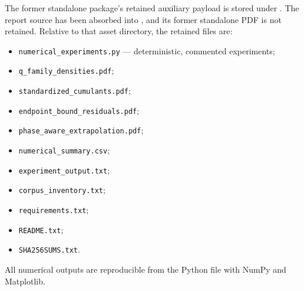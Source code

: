 \documentclass[11pt]{article}
\numberwithin{equation}{section}
\theoremstyle{definition}
\theoremstyle{remark}
\begin{document}
The former standalone package's retained auxiliary payload is stored under
.  The report source has been absorbed into
, and its former standalone PDF is not retained.  Relative to
that asset directory, the retained files are:
\begin{itemize}
\item \texttt{numerical\_experiments.py} --- deterministic, commented experiments;
\item \texttt{q\_family\_densities.pdf};
\item \texttt{standardized\_cumulants.pdf};
\item \texttt{endpoint\_bound\_residuals.pdf};
\item \texttt{phase\_aware\_extrapolation.pdf};
\item \texttt{numerical\_summary.csv};
\item \texttt{experiment\_output.txt};
\item \texttt{corpus\_inventory.txt};
\item \texttt{requirements.txt};
\item \texttt{README.txt};
\item \texttt{SHA256SUMS.txt}.
\end{itemize}
All numerical outputs are reproducible from the Python file with NumPy and Matplotlib.
\end{document}
